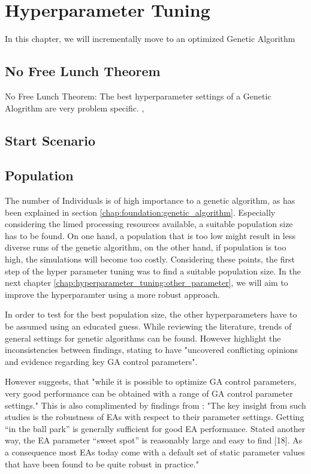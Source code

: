 \chapter{Hyperparameter Tuning}
\label{chap:hyperparameter_tuning}
In this chapter, we will incrementally move to an optimized Genetic Algorithm

\section{No Free Lunch Theorem}
No Free Lunch Theorem:
The best hyperparameter settings of a Genetic Alogrithm are very problem specific. \cite{kacprzyk_parameter_2007}, \cite{dao_maximising_2016} 

\section{Start Scenario}

\section{Population}
\label{chap:hyperparameter_tuning:population}
The number of Individuals is of high importance to a genetic algorithm, as has been explained in section \ref{chap:foundation:genetic_algorithm}. Especially considering the limed processing resources available, a suitable population size has to be found. On one hand, a population that is too low might result in less diverse runs of the genetic algorithm, on the other hand, if population is too high, the simulations will become too costly. Considering these points, the first step of the hyper parameter tuning was to find a suitable population size. In the next chapter \ref{chap:hyperparameter_tuning:other_parameter}, we will aim to improve the hyperparamter using a more robust approach.

In order to test for the best population size, the other hyperparameters have to be assumed using an educated guess. While reviewing the literature, trends of general settings for genetic algorithms can be found. However \cite{mills_determining_2015} highlight the inconsistencies between findings, stating to have "uncovered conflicting opinions and evidence regarding key GA control parameters". 

However \cite{grefenstette_optimization_1986} suggests, that "while it is possible to optimize GA control parameters, very good performance can be obtained with a range of GA control parameter settings." 
This is also complimented by findings from \cite{kacprzyk_parameter_2007}: "The key insight from such studies is the robustness of EAs with respect to their parameter settings. Getting “in the ball park” is generally sufficient for good EA performance. Stated another way, the EA parameter “sweet spot” is reasonably large and easy to find [18]. As a consequence most EAs today come with a default set of static parameter values that have been found to be quite robust in practice."

